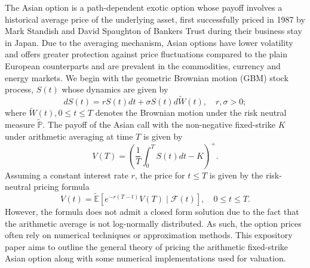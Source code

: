 
The Asian option is a path-dependent exotic option whose payoff involves a historical average price of the underlying asset, first successfully priced in 1987 by Mark Standish and David Spaughton of Bankers Trust during their business stay in Japan.
Due to the averaging mechanism, Asian options have lower volatility and offers greater protection against price fluctuations compared to the plain European counterparts and are prevalent in the commodities, currency and energy markets.
We begin with the geometric Brownian motion (GBM) stock process, \(S(t)\) whose dynamics are given by
\begin{equation}
    d S(t)=r S(t) d t+\sigma S(t) d \widetilde{W}(t),\quad r, \sigma > 0;\label{eq:1}
\end{equation}
where \(\widetilde{W}(t), 0\leq t\leq T\) denotes the Brownian motion under the risk neutral measure \(\widetilde{\mathbb{P}}\).
The payoff of the Asian call with the non-negative fixed-strike \(K\) under arithmetic averaging at time \(T\) is given by
\begin{equation}
    V(T) = \left(\frac{1}{T} \int_0^T S(t) d t-K\right)^{+}. \label{eq:2}
\end{equation}
Assuming a constant interest rate \(r\), the price for \(t \leq T\) is given by the risk-neutral pricing formula
\begin{equation}
    V(t)=\tilde{\mathbb{E}}\left[e^{-r(T-t)} V(T) \mid \mathcal{F}(t)\right], \quad 0 \leq t \leq T. \label{eq:3}
\end{equation}
However, the formula does not admit a closed form solution due to the fact that the arithmetic average is not log-normally distributed.
As such, the option prices often rely on numerical techniques or approximation methods.
This expository paper aims to outline the general theory of pricing the arithmetic fixed-strike Asian option along with some numerical implementations used for valuation.
